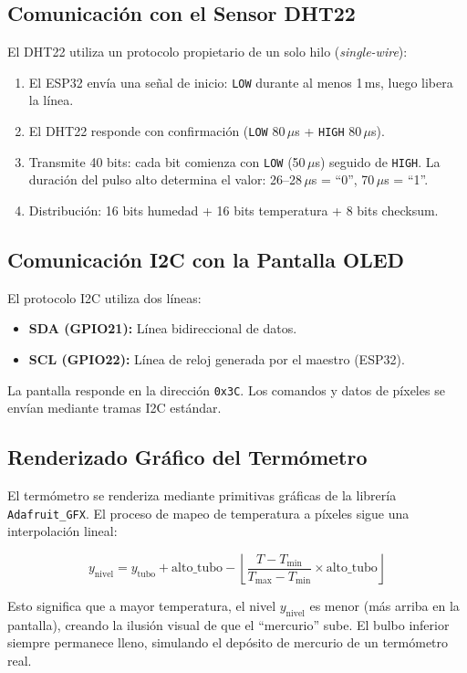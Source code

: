 \documentclass[12pt,a4paper]{article}
\begin{document}
\subsection{Comunicación con el Sensor DHT22}
El DHT22 utiliza un protocolo propietario de un solo hilo (\textit{single-wire}):
\begin{enumerate}
    \item El ESP32 envía una señal de inicio: \texttt{LOW} durante al menos 1\,ms, luego libera la línea.
    \item El DHT22 responde con confirmación (\texttt{LOW} 80\,$\mu$s + \texttt{HIGH} 80\,$\mu$s).
    \item Transmite 40 bits: cada bit comienza con \texttt{LOW} (50\,$\mu$s) seguido de \texttt{HIGH}. La duración del pulso alto determina el valor: 26--28\,$\mu$s = ``0'', 70\,$\mu$s = ``1''.
    \item Distribución: 16 bits humedad + 16 bits temperatura + 8 bits checksum.
\end{enumerate}

\subsection{Comunicación I2C con la Pantalla OLED}
El protocolo I2C utiliza dos líneas:
\begin{itemize}
    \item \textbf{SDA (GPIO21):} Línea bidireccional de datos.
    \item \textbf{SCL (GPIO22):} Línea de reloj generada por el maestro (ESP32).
\end{itemize}
La pantalla responde en la dirección \texttt{0x3C}. Los comandos y datos de píxeles se envían mediante tramas I2C estándar.

\subsection{Renderizado Gráfico del Termómetro}
El termómetro se renderiza mediante primitivas gráficas de la librería \texttt{Adafruit\_GFX}. El proceso de mapeo de temperatura a píxeles sigue una interpolación lineal:

\begin{equation}
y_{\text{nivel}} = y_{\text{tubo}} + \text{alto\_tubo} - \left\lfloor \frac{T - T_{\min}}{T_{\max} - T_{\min}} \times \text{alto\_tubo} \right\rfloor
\label{eq:nivel}
\end{equation}

Esto significa que a mayor temperatura, el nivel $y_{\text{nivel}}$ es menor (más arriba en la pantalla), creando la ilusión visual de que el ``mercurio'' sube. El bulbo inferior siempre permanece lleno, simulando el depósito de mercurio de un termómetro real.
\end{document}
